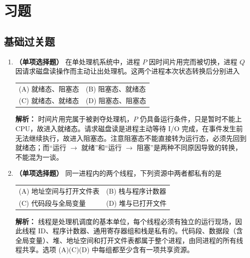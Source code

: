 \section{习题}

\subsection{基础过关题}

\begin{enumerate}

\item \textbf{（单项选择题）} 在单处理机系统中，进程 $P$ 因时间片用完而被切换，进程 $Q$ 因请求磁盘读操作而主动让出处理机。这两个进程本次状态转换后分别进入
\begin{center}
\begin{tabular}{ll}
(A) 就绪态、阻塞态 & (B) 阻塞态、就绪态 \\[4pt]
(C) 就绪态、就绪态 & (D) 阻塞态、阻塞态
\end{tabular}
\end{center}

\ifshowsolutions\par\noindent\textbf{解析：} 时间片用完属于被剥夺处理机，$P$ 仍具备运行条件，只是暂时不能上 CPU，故进入就绪态。请求磁盘读是进程主动等待 I/O 完成，在事件发生前无法继续执行，故进入阻塞态。注意阻塞态不能直接转为运行态，必须先回到就绪态；而“运行 $\to$ 就绪”和“运行 $\to$ 阻塞”是两种不同原因导致的转换，不能混为一谈。\else \answerarea \fi

\vspace{8pt}

\item \textbf{（单项选择题）} 同一进程内的两个线程，下列资源中两者都私有的是
\begin{center}
\begin{tabular}{ll}
(A) 地址空间与打开文件表 & (B) 栈与程序计数器 \\[4pt]
(C) 代码段与全局变量 & (D) 堆与已打开文件
\end{tabular}
\end{center}

\ifshowsolutions\par\noindent\textbf{解析：} 线程是处理机调度的基本单位，每个线程必须有独立的运行现场，因此线程 ID、程序计数器、通用寄存器组和栈是私有的。代码段、数据段（含全局变量）、堆、地址空间和打开文件表都属于整个进程，由同进程的所有线程共享。选项 (A)(C)(D) 中每组都至少含有一项共享资源。\else \answerarea \fi


\end{enumerate}

